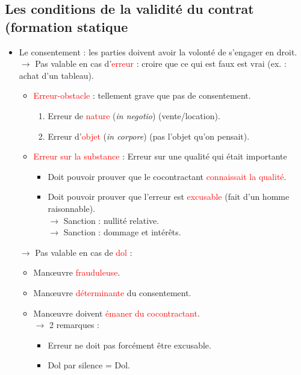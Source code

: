 \subsection{Les conditions de la validité du contrat (formation statique}

\begin{itemize}
	\item Le consentement : les parties doivent avoir la volonté de s'engager en droit.\\
	$\rightarrow$ Pas valable en cas d'\textcolor{red}{erreur} : croire que ce qui est faux est vrai (ex. : achat d'un tableau).
	\begin{itemize}
		\item \textcolor{red}{Erreur-obstacle} : tellement grave que pas de consentement.
		\begin{enumerate}
			\item Erreur de \textcolor{red}{nature} (\textit{in negotio}) (vente/location).
			\item Erreur d'\textcolor{red}{objet} (\textit{in corpore}) (pas l'objet qu'on pensait).
		\end{enumerate}
		\item \textcolor{red}{Erreur sur la substance} : Erreur sur une qualité qui était importante
		\begin{itemize}
			\item Doit pouvoir prouver que le cocontractant \textcolor{red}{connaissait la qualité}.
			\item Doit pouvoir prouver que l'erreur est \textcolor{red}{excusable} (fait d'un homme raisonnable).\\
			$\rightarrow$ Sanction : nullité relative.\\
			$\rightarrow$ Sanction : dommage et intérêts.
		\end{itemize}
	\end{itemize}
	$\rightarrow$ Pas valable en cas de \textcolor{red}{dol} :
	\begin{itemize}
		\item Manœuvre \textcolor{red}{frauduleuse}.
		\item Manœuvre \textcolor{red}{déterminante} du consentement.
		\item Manœuvre doivent \textcolor{red}{émaner du cocontractant}.\\
		$\rightarrow$ 2 remarques :
		\begin{itemize}
			\item Erreur ne doit pas forcément être excusable.
			\item Dol par silence = Dol.

\end{itemize}
\end{itemize}
\end{itemize}
